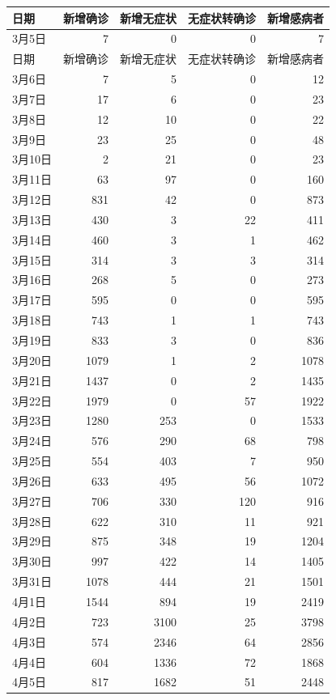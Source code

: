 \documentclass[12pt]{article}
\begin{document}
\begin{longtable}[c]{|l|r|r|r|r|}
\hline
日期 & 新增确诊 & 新增无症状 & 无症状转确诊 & 新增感病者 \\
\hline
3月5日 & 7 & 0 & 0 & 7 \\
\hline
日期 & 新增确诊 & 新增无症状 & 无症状转确诊 & 新增感病者 \\
\hline
3月6日 & 7 & 5 & 0 & 12 \\
3月7日 & 17 & 6 & 0 & 23 \\
3月8日 & 12 & 10 & 0 & 22 \\
3月9日 & 23 & 25 & 0 & 48 \\
3月10日 & 2 & 21 & 0 & 23 \\
3月11日 & 63 & 97 & 0 & 160 \\
3月12日 & 831 & 42 & 0 & 873 \\
3月13日 & 430 & 3 & 22 & 411 \\
3月14日 & 460 & 3 & 1 & 462 \\
3月15日 & 314 & 3 & 3 & 314 \\
3月16日 & 268 & 5 & 0 & 273 \\
3月17日 & 595 & 0 & 0 & 595 \\
3月18日 & 743 & 1 & 1 & 743 \\
3月19日 & 833 & 3 & 0 & 836 \\
3月20日 & 1079 & 1 & 2 & 1078 \\
3月21日 & 1437 & 0 & 2 & 1435 \\
3月22日 & 1979 & 0 & 57 & 1922 \\
3月23日 & 1280 & 253 & 0 & 1533 \\
3月24日 & 576 & 290 & 68 & 798 \\
3月25日 & 554 & 403 & 7 & 950 \\
3月26日 & 633 & 495 & 56 & 1072 \\
3月27日 & 706 & 330 & 120 & 916 \\
3月28日 & 622 & 310 & 11 & 921 \\
3月29日 & 875 & 348 & 19 & 1204 \\
3月30日 & 997 & 422 & 14 & 1405 \\
3月31日 & 1078 & 444 & 21 & 1501 \\
4月1日 & 1544 & 894 & 19 & 2419 \\
4月2日 & 723 & 3100 & 25 & 3798 \\
4月3日 & 574 & 2346 & 64 & 2856 \\
4月4日 & 604 & 1336 & 72 & 1868 \\
4月5日 & 817 & 1682 & 51 & 2448 \\

\end{longtable}
\end{document}
